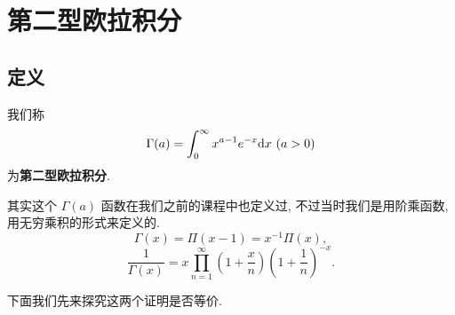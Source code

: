 \section{第二型欧拉积分}

\subsection{定义}
\begin{definition}\label{第二型欧拉积分}
	我们称 $$\Gamma(a)=\int_0^\infty x^{a-1}e^{-x} \t d x\ (a>0)$$ 为\textbf{第二型欧拉积分}.

	其实这个 $\Gamma(a)$ 函数在我们之前的课程中也定义过, 不过当时我们是用阶乘函数, 用无穷乘积的形式来定义的.
	$$\Gamma(x)=\Pi(x-1)=x^{-1}\Pi(x),$$
	$$ \dfrac{1}{\Gamma(x)}=x\prod\limits_{n=1}^\infty(1+\dfrac{x}{n})(1+\dfrac 1 n)^{-x}.$$
\end{definition}

下面我们先来探究这两个证明是否等价.

